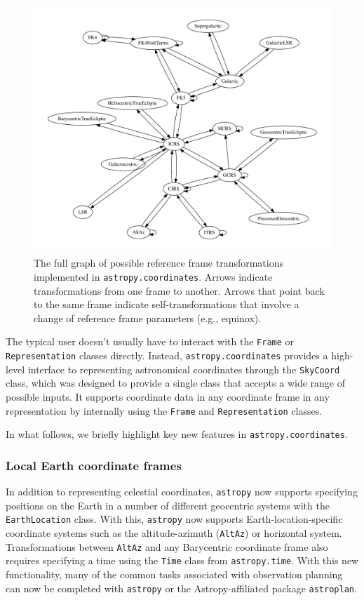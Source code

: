 \documentclass[modern]{aastex61}
\newcommand{\package}[1]{\texttt{#1}\xspace}
\newcommand{\astropy}{Astropy\xspace}
\newcommand{\astropypkg}{\package{astropy}}
\begin{document}
\begin{figure}
\includegraphics[width=\textwidth]{coordinates_graph.pdf}
\caption{%
    The full graph of possible reference frame transformations implemented in
    \texttt{astropy.coordinates}.
    Arrows indicate transformations from one frame to another.
    Arrows that point back to the same frame indicate self-transformations that
    involve a change of reference frame parameters (e.g., equinox).
    \label{fig:frame-transform-graph}
}
\end{figure}

The typical user doesn't usually have to interact with the \texttt{Frame} or
\texttt{Representation} classes directly.
Instead, \texttt{astropy.coordinates} provides a high-level interface to
representing astronomical coordinates through the \texttt{SkyCoord} class,
which was designed to provide a single class that
accepts a wide range of possible inputs.
It supports coordinate data in any coordinate frame in any representation by
internally using the \texttt{Frame} and \texttt{Representation} classes.

In what follows, we briefly highlight key new features in
\texttt{astropy.coordinates}.

\subsubsection{Local Earth coordinate frames}
In addition to representing celestial
    coordinates, \astropypkg now supports specifying positions on the Earth in
    a number of different geocentric systems with the \texttt{EarthLocation}
    class.
    With this, \astropypkg now supports Earth-location-specific coordinate
    systems such as the altitude-azimuth (\texttt{AltAz}) or horizontal system.
    Transformations between \texttt{AltAz} and any Barycentric coordinate frame
    also requires specifying a time using the \texttt{Time} class from
    \texttt{astropy.time}.
    With this new functionality, many of the common tasks associated with
    observation planning can now be completed with \astropypkg or the
    \astropy-affiliated package \package{astroplan}\citep{astroplan_AAS}.
\end{document}

